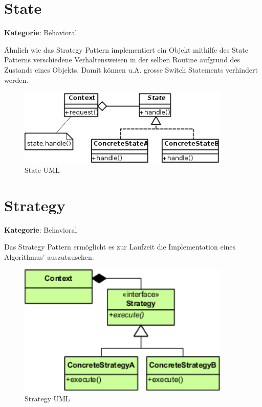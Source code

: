 \section{State}
\textbf{Kategorie}: Behavioral

Ähnlich wie das Strategy Pattern implementiert ein Objekt mithilfe des State Patterns verschiedene Verhaltensweisen in der selben Routine aufgrund des Zustands eines Objekts. Damit können u.A. grosse Switch Statements verhindert werden.

\begin{figure}[H]
	\centering
	\includegraphics[width=0.9\textwidth]{content/gof/images/15-state-uml.png}
	\caption{State UML}
\end{figure}


\section{Strategy}
\textbf{Kategorie}: Behavioral

Das Strategy Pattern ermöglicht es zur Laufzeit die Implementation eines Algorithmus' auszutauschen.

\begin{figure}[H]
	\centering
	\includegraphics[width=0.9\textwidth]{content/gof/images/16-strategy-uml.png}
	\caption{Strategy UML}
\end{figure}


